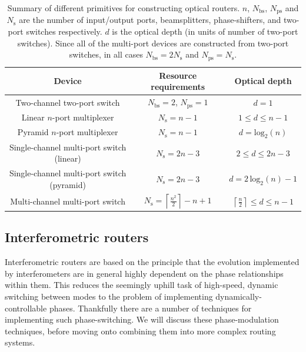 \documentclass[aps, rmp, twocolumn, amsmath, amssymb, nofootinbib, superscriptaddress, longbibliography, floatfix, table-of-contents, eqsecnum]{revtex4-1}
\renewcommand{\tablename}{ALG.}
\begin{document}
\begin{table}[!htb]
	\begin{tabular}{|c|c|c|}
		\hline
  		Device & Resource requirements & Optical depth \\
  		\hline
  		\hline
  		Two-channel two-port switch & \mbox{$N_\text{bs}=2$}, \mbox{$N_\text{ps}=1$} & \mbox{$d=1$} \\
  		Linear $n$-port multiplexer & \mbox{$N_\text{s}=n-1$} & \mbox{$1\leq d\leq n-1$} \\
  		Pyramid $n$-port multiplexer & \mbox{$N_\text{s}=n-1$} & \mbox{$d=\text{log}_2(n)$} \\
    	Single-channel multi-port switch (linear) & \mbox{$N_\text{s}=2n-3$} & \mbox{$2\leq d\leq 2n-3$} \\
  		Single-channel multi-port switch (pyramid) & \mbox{$N_\text{s}=2n-3$} & \mbox{$d=2\,\text{log}_2(n)-1$} \\
  		Multi-channel multi-port switch & \mbox{$N_\text{s} = \left\lceil \frac{n^2}{2}\right\rceil - n + 1$} & \mbox{$\left\lceil \frac{n}{2} \right\rceil \leq d\leq n-1$} \\
    	\hline
	\end{tabular}
	\caption{Summary of different primitives for constructing optical routers. $n$, $N_\text{bs}$, $N_\text{ps}$ and $N_\text{s}$ are the number of input/output ports, beamsplitters, phase-shifters, and two-port switches respectively. $d$ is the optical depth (in units of number of two-port switches). Since all of the multi-port devices are constructed from two-port switches, in all cases \mbox{$N_\text{bs} = 2 N_\text{s}$} and \mbox{$N_\text{ps} = N_\text{s}$}.} \label{tab:router_summary} 
\end{table}

\renewcommand{\tablename}{ALG.}

%
%

\subsection{Interferometric routers} 

Interferometric routers are based on the principle that the evolution implemented by interferometers are in general highly dependent on the phase relationships within them. This reduces the seemingly uphill task of high-speed, dynamic switching between modes to the problem of implementing dynamically-controllable phases. Thankfully there are a number of techniques for implementing such phase-switching. We will discuss these phase-modulation techniques, before moving onto combining them into more complex routing systems.
\end{document}
